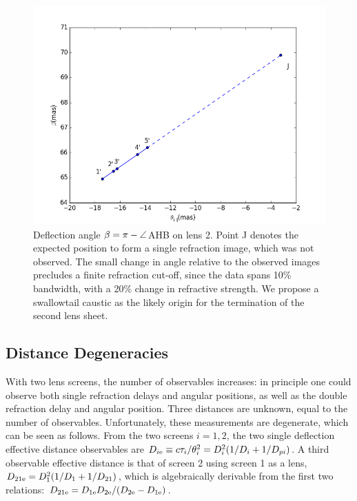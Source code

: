\documentclass[useAMS,usenatbib]{mn2e}
\begin{document}
\begin{figure}
\centering
\includegraphics[width=1.0\linewidth]{Reflection_angle.png}
\caption{Deflection angle $\beta=\pi-\protect\angle$AHB on lens 2.  Point J denotes the expected position to form a single refraction image, which was not
  observed.   The small change in angle relative to the observed
  images precludes a finite refraction cut-off, since the data spans
  10\% bandwidth, with a 20\% change in refractive strength.  We
  propose a swallowtail caustic as the likely origin for the
  termination of the second lens sheet.
}
\label{vtrans}
\end{figure}

\subsection{Distance Degeneracies}
\label{sec:degeneracy}
With two lens screens, the number of observables increases: in
principle one could observe both single refraction delays and angular
positions, as well as the double refraction delay and angular
position.  Three distances are unknown, equal to the number of
observables.  Unfortunately, these measurements are degenerate, which
can be seen as follows. From the two screens $i=1,2$, the two single
deflection effective distance observables are
$D_{i{\rm e}} \equiv c\tau_i/\theta_i^2=D_i^2(1/D_i+1/D_{pi})$.  A third
observable effective distance is that of screen 2 using screen 1 as a
lens, $D_{21{\rm e}}=D_1^2(1/D_1+1/D_{21})$, which is algebraically
derivable from the first two relations:
$D_{{21}{\rm e}}=D_{1{\rm e}}D_{2{\rm e}}/(D_{2{\rm e}}-D_{1{\rm e}})$.  
\end{document}
